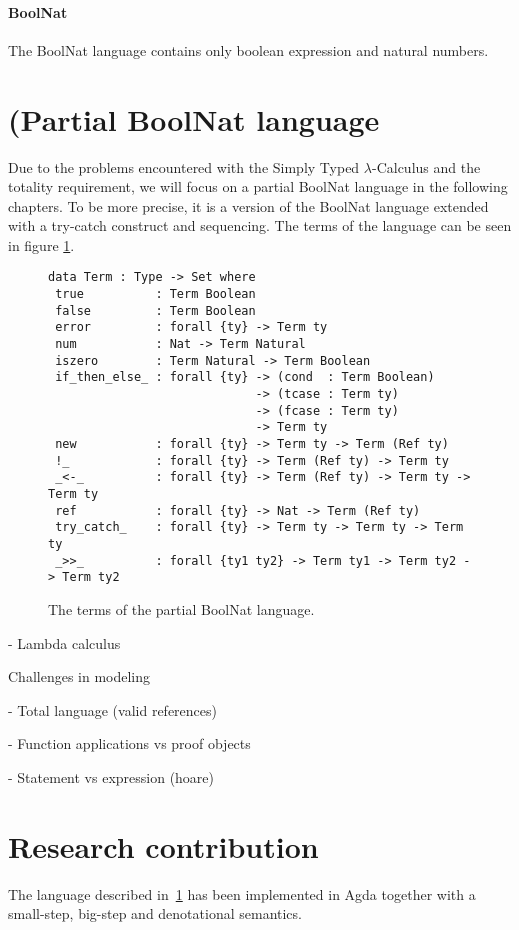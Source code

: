 \documentclass[12pt, a4paper, oneside]{article}
\begin{document}
\paragraph{BoolNat}
The BoolNat language contains only boolean expression and natural numbers.

\section{(Partial BoolNat language}
\label{sec:boolnat}

Due to the problems encountered with the Simply Typed $\lambda$-Calculus and the totality requirement, we will focus on a partial BoolNat
language in the following chapters. To be more precise, it is a version of the BoolNat language extended with a try-catch construct and 
sequencing. The terms of the language can be seen in figure \ref{lst:part-boolnat-term}.

\begin{figure}
\begin{lstlisting}
data Term : Type -> Set where
 true          : Term Boolean
 false         : Term Boolean
 error         : forall {ty} -> Term ty 
 num           : Nat -> Term Natural
 iszero        : Term Natural -> Term Boolean
 if_then_else_ : forall {ty} -> (cond  : Term Boolean)
                             -> (tcase : Term ty)
                             -> (fcase : Term ty)
                             -> Term ty
 new           : forall {ty} -> Term ty -> Term (Ref ty)
 !_            : forall {ty} -> Term (Ref ty) -> Term ty
 _<-_          : forall {ty} -> Term (Ref ty) -> Term ty -> Term ty
 ref           : forall {ty} -> Nat -> Term (Ref ty)
 try_catch_    : forall {ty} -> Term ty -> Term ty -> Term ty
 _>>_          : forall {ty1 ty2} -> Term ty1 -> Term ty2 -> Term ty2
\end{lstlisting}
\caption{The terms of the partial BoolNat language.}
\label{lst:part-boolnat-term}
\end{figure}







		- Lambda calculus

		Challenges in modeling

			- Total language (valid references)

			- Function applications vs proof objects

			- Statement vs expression (hoare)


\section{Research contribution}
\label{sec:cont}
The language described in~\ref{sec:boolnat} has been implemented in Agda together with a small-step, big-step and denotational semantics.
\end{document}
